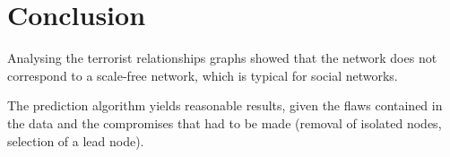 \section{Conclusion}
\label{sec:Conclusion}
Analysing the terrorist relationships graphs showed that the network does not correspond to a scale-free network, which is typical for social networks.

The prediction algorithm yields reasonable results, given the flaws contained in the data and the compromises that had to be made (removal of isolated nodes, selection of a lead node).




